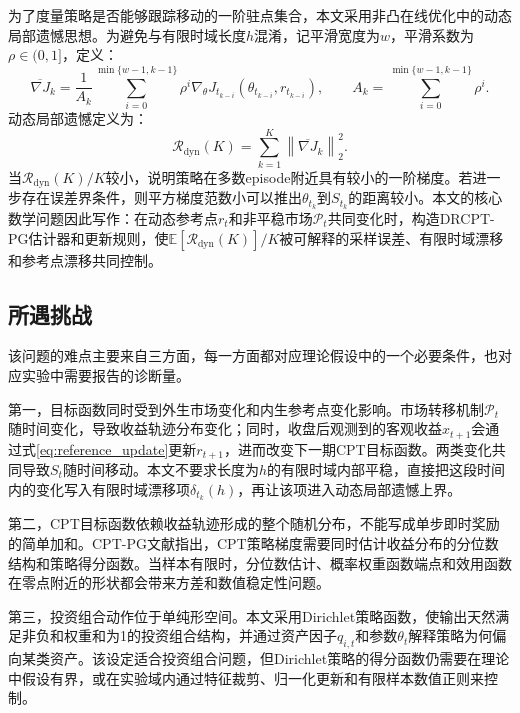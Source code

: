 为了度量策略是否能够跟踪移动的一阶驻点集合，本文采用非凸在线优化中的动态局部遗憾思想\citep{hazan2017efficient,aydore2019dynamic}。为避免与有限时域长度$h$混淆，记平滑宽度为$w$，平滑系数为$\rho\in(0,1]$，定义：
\begin{equation}
\label{eq:smoothed_gradient}
\overline{\nabla J}_k
=
\frac{1}{A_k}
\sum_{i=0}^{\min\{w-1,k-1\}}
\rho^i
\nabla_\theta J_{t_{k-i}}(\theta_{t_{k-i}},r_{t_{k-i}}),
\qquad
A_k=
\sum_{i=0}^{\min\{w-1,k-1\}}\rho^i.
\end{equation}
动态局部遗憾定义为：
\begin{equation}
\label{eq:dynamic_local_regret}
\mathcal{R}_{\mathrm{dyn}}(K)
=
\sum_{k=1}^{K}
\left\|
\overline{\nabla J}_k
\right\|_2^2.
\end{equation}
当$\mathcal{R}_{\mathrm{dyn}}(K)/K$较小，说明策略在多数episode附近具有较小的一阶梯度。若进一步存在误差界条件，则平方梯度范数小可以推出$\theta_{t_k}$到$S_{t_k}$的距离较小。本文的核心数学问题因此写作：在动态参考点$r_t$和非平稳市场$\mathcal{P}_t$共同变化时，构造DRCPT-PG估计器和更新规则，使$\mathbb{E}[\mathcal{R}_{\mathrm{dyn}}(K)]/K$被可解释的采样误差、有限时域漂移和参考点漂移共同控制。

\subsection{所遇挑战}

该问题的难点主要来自三方面，每一方面都对应理论假设中的一个必要条件，也对应实验中需要报告的诊断量。

第一，目标函数同时受到外生市场变化和内生参考点变化影响。市场转移机制$\mathcal{P}_t$随时间变化，导致收益轨迹分布变化；同时，收盘后观测到的客观收益$x_{t+1}$会通过式\eqref{eq:reference_update}更新$r_{t+1}$，进而改变下一期CPT目标函数。两类变化共同导致$S_t$随时间移动。本文不要求长度为$h$的有限时域内部平稳，直接把这段时间内的变化写入有限时域漂移项$\delta_{t_k}(h)$，再让该项进入动态局部遗憾上界。

第二，CPT目标函数依赖收益轨迹形成的整个随机分布，不能写成单步即时奖励的简单加和。CPT-PG文献指出，CPT策略梯度需要同时估计收益分布的分位数结构和策略得分函数\citep{prashanth2016cumulative,lepel2026policygradients}。当样本有限时，分位数估计、概率权重函数端点和效用函数在零点附近的形状都会带来方差和数值稳定性问题。

第三，投资组合动作位于单纯形空间。本文采用Dirichlet策略函数，使输出天然满足非负和权重和为1的投资组合结构，并通过资产因子$q_{i,t}$和参数$\theta_t$解释策略为何偏向某类资产。该设定适合投资组合问题，但Dirichlet策略的得分函数仍需要在理论中假设有界，或在实验域内通过特征裁剪、归一化更新和有限样本数值正则来控制。

